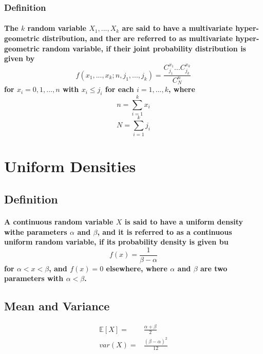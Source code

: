 \documentclass[titlepage]{article}
\begin{document}
            \subsubsection*{Definition}
                \paragraph{
                    The $k$ random variable $X_1,...,X_k$ are said to have a multivariate hyper-geometric distribution, and ther are referred to as multivariate hyper-geometric random variable, if their joint probability distribution is given by
                    $$f(x_1,...,x_k;n,j_1,...,j_k)=\frac{C_{j_1}^{x_1}...C_{j_k}^{x_k}}{C_N^n}$$
                    for $x_i=0,1,...,n$ with $x_i\leq j_i$ for each $i=1,...,k$, where 
                    $$n=\sum_{i=1}^kx_i$$
                    $$N=\sum_{i=1}^kj_i$$
                }

    \section{Uniform Densities}
        \subsection*{Definition}
            \paragraph{
                A continuous random variable $X$ is said to have a uniform density withe parameters $\alpha$ and $\beta$, and it is referred to as a continuous uniform random variable, if its probability density is given bu
                $$f(x)=\frac{1}{\beta-\alpha}$$ 
                for $\alpha<x<\beta$, and $f(x)=0$ elsewhere, where $\alpha$ and $\beta$ are two parameters with $\alpha<\beta$.
            }
        \subsection*{Mean and Variance}
            \begin{equation*}
                \begin{split}
                    \mathbb{E}[X]=&\frac{\alpha+\beta}{2}\\
                    var(X)=&\frac{(\beta-\alpha)^2}{12}\\
                \end{split}
            \end{equation*}
\end{document}
